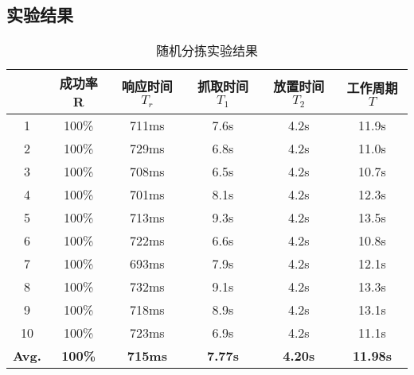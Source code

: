 \subsection{实验结果}
\begin{table}[ht]
  \centering
  \caption{随机分拣实验结果}
  \begin{tabular}{cccccc}
    \toprule
    &成功率R&响应时间$T_r$&抓取时间$T_1$&放置时间$T_2$&工作周期$T$ \\
    \midrule
    1&100\%&711ms&7.6s&4.2s&11.9s \\
    2&100\%&729ms&6.8s&4.2s&11.0s \\
    3&100\%&708ms&6.5s&4.2s&10.7s \\
    4&100\%&701ms&8.1s&4.2s&12.3s \\
    5&100\%&713ms&9.3s&4.2s&13.5s \\
    6&100\%&722ms&6.6s&4.2s&10.8s \\
    7&100\%&693ms&7.9s&4.2s&12.1s \\
    8&100\%&732ms&9.1s&4.2s&13.3s \\
    9&100\%&718ms&8.9s&4.2s&13.1s \\
   10&100\%&723ms&6.9s&4.2s&11.1s \\
    \bf{Avg.}&\bf{100\%}&\bf{715ms}&\bf{7.77s}&\bf{4.20s}&\bf{11.98s} \\
    \bottomrule
  \end{tabular}
  \label{tab:app_res}
\end{table}
